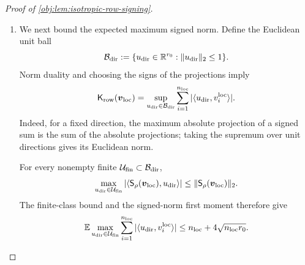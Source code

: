 \begin{proof}[Proof of \cref{obj:lem:isotropic-row-signing}]
\begin{enumerate}
For any local sample, averaging over the fair signs cancels the off-diagonal terms:
\[
\mathbb E_\rho\|\mathsf S_\rho(\boldsymbol v_{\rm loc})\|_2^2
=\sum_{i=1}^{n_{\rm loc}}\|v_i^{\rm loc}\|_2^2.
\]
Thus
\[
\mathbb E\|\mathsf S_\rho(\boldsymbol v_{\rm loc})\|_2^2
=n_{\rm loc}r_0,
\qquad
\mathbb E\|\mathsf S_\rho(\boldsymbol v_{\rm loc})\|_2
\leq\sqrt{n_{\rm loc}r_0}.
\]
For every fixed \(u_{\rm dir}\in\mathbb R^{r_0}\), the projection estimate gives
\[
\mathbb E_{\rm right}
\sum_{i'=1}^{n_{\rm right}}
|\langle u_{\rm dir},v_{i'}^{\rm right}\rangle|
\leq n_{\rm right}\|u_{\rm dir}\|_2.
\]
Independence allows this estimate to be applied conditional on the left sample and its signs. Interchanging the integrable expectations yields
\[
\mathbb E
\sum_{i'=1}^{n_{\rm right}}
|\langle\mathsf S_\rho(\boldsymbol v_{\rm left}),v_{i'}^{\rm right}\rangle|
\leq
n_{\rm right}\sqrt{n_{\rm left}r_0}.
\]
After integrating the conditional cross-group bound, we obtain
\[
\mathbb E\mathsf H_{\rm cross}(\boldsymbol v_{\rm left},\boldsymbol v_{\rm right})
\leq
n_{\rm left}\mathbb E\mathsf K_{\rm row}(\boldsymbol v_{\rm right})
+4n_{\rm right}\sqrt{n_{\rm left}r_0}.
\]

\item We next bound the expected maximum signed norm.
Define the Euclidean unit ball
\[
\mathcal B_{\rm dir}
:=\{u_{\rm dir}\in\mathbb R^{r_0}:\|u_{\rm dir}\|_2\leq1\}.
\]
Norm duality and choosing the signs of the projections imply
\[
\mathsf K_{\rm row}(\boldsymbol v_{\rm loc})
=
\sup_{u_{\rm dir}\in\mathcal B_{\rm dir}}
\sum_{i=1}^{n_{\rm loc}}|\langle u_{\rm dir},v_i^{\rm loc}\rangle|.
\]
Indeed, for a fixed direction, the maximum absolute projection of a signed sum is the sum of the absolute projections; taking the supremum over unit directions gives its Euclidean norm.

For every nonempty finite \(\mathcal U_{\rm fin}\subset\mathcal B_{\rm dir}\),
\[
\max_{u_{\rm dir}\in\mathcal U_{\rm fin}}
|\langle\mathsf S_\rho(\boldsymbol v_{\rm loc}),u_{\rm dir}\rangle|
\leq\|\mathsf S_\rho(\boldsymbol v_{\rm loc})\|_2.
\]
The finite-class bound and the signed-norm first moment therefore give
\[
\mathbb E\max_{u_{\rm dir}\in\mathcal U_{\rm fin}}
\sum_{i=1}^{n_{\rm loc}}|\langle u_{\rm dir},v_i^{\rm loc}\rangle|
\leq n_{\rm loc}+4\sqrt{n_{\rm loc}r_0}.
\]


\end{enumerate}
\end{proof}
